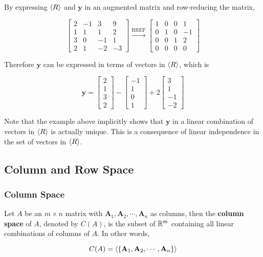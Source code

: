 \documentclass[a4paper,12pt]{article}
\begin{document}
\begin{exm}
  By expressing $\left\langle R\right\rangle$ and $\mathbf{y}$ in an augmented matrix and row-reducing the matrix,

  $$\begin{bmatrix}
    2 & -1 & 3 & 9\\
    1 & 1 & 1 & 2\\
    3 & 0 & -1 & 1\\
    2 & 1 & -2 & -3
  \end{bmatrix}\xrightarrow[ ]{\text{RREF}}\begin{bmatrix}
    1 & 0 & 0 & 1\\
    0 & 1 & 0 & -1\\
    0 & 0 & 1 & 2\\
    0 & 0 & 0 & 0
  \end{bmatrix}$$\s

  Therefore $\mathbf{y}$ can be expressed in terms of vectors in $\left\langle R\right\rangle$, which is

  $$\mathbf{y}=\begin{bmatrix}
    2\\
    1\\
    3\\
    2
  \end{bmatrix}-\begin{bmatrix}
    -1\\
    1\\
    0\\
    1
  \end{bmatrix}+2\begin{bmatrix}
    3\\
    1\\
    -1\\
    -2
  \end{bmatrix}$$
\end{exm}\s

Note that the example above implicitly shows that $\mathbf{y}$ in a linear combination of vectors in $\left\langle R\right\rangle$ is actually unique. This is a consequence of linear independence in the set of vectors in $\left\langle R\right\rangle$.

\subsection{Column and Row Space}
\subsubsection{Column Space}
\begin{dft}
  Let $A$ be an $m\times n$ matrix with $\mathbf{A}_{1},\mathbf{A}_{2},\cdots,\mathbf{A}_{n}$ as columns, then the \textbf{column space} of $A$, denoted by $C(A)$, is the subset of $\mathbb{R}^{m}$ containing all linear combinations of columns of $A$. In other words,

  $$C(A)=\left\langle \left\{ \mathbf{A}_{1},\mathbf{A}_{2},\cdots,\mathbf{A}_{n}\right\}\right\rangle$$
\end{dft}\n
\end{document}
